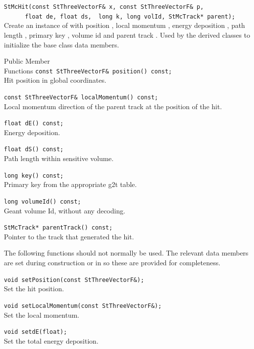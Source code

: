\begin{Entry}
    \verb+StMcHit(const StThreeVectorF& x, const StThreeVectorF& p,+\\
    \verb+      float de, float ds,  long k, long volId, StMcTrack* parent);+\\
    
    Create an instance of  with position , local momentum ,
    energy deposition , path length , primary key ,
    volume id  and parent track .  Used by the derived
    classes to initialize the base class data members.

\item[Public Member\\ Functions]
    \verb+const StThreeVectorF& position() const;+\\
    Hit position in global coordinates.

    \verb+const StThreeVectorF& localMomentum() const;+\\
    Local momentum direction of the parent track at the position of the hit.

    \verb+float dE() const;+\\
    Energy deposition.

    \verb+float dS() const;+\\
    Path length within sensitive volume.

    \verb+long key() const;+\\
    Primary key from the appropriate g2t table.

    \verb+long volumeId() const;+\\
    Geant volume Id, without any decoding.

    \verb+StMcTrack* parentTrack() const;+\\
    Pointer to the track that generated the hit.

    The following functions should not normally be used.
    The relevant data members are set during construction or
    in  so these are provided for completeness.

    \verb+void setPosition(const StThreeVectorF&);+\\
    Set the hit position.

    \verb+void setLocalMomentum(const StThreeVectorF&);+\\
    Set the local momentum.

    \verb+void setdE(float);+\\
    Set the total energy deposition.


\end{Entry}
